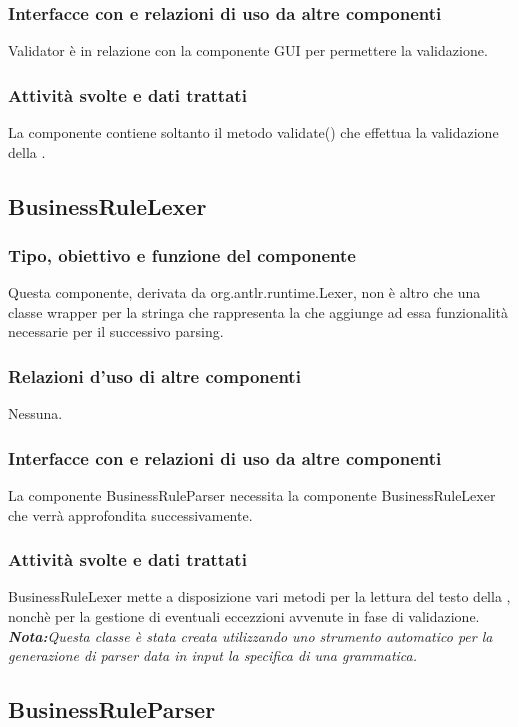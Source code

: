\documentclass[11pt,titlepage,a4paper]{report}
\begin{document}
\subsubsection{Interfacce con e relazioni di uso da altre componenti}
Validator \`e in relazione con la componente GUI per permettere la validazione.
\subsubsection{Attivit\`a svolte e dati trattati}
La componente contiene soltanto il metodo validate() che effettua la validazione della \br.

\subsection{BusinessRuleLexer}
\subsubsection{Tipo, obiettivo e funzione del componente}
Questa componente, derivata da org.antlr.runtime.Lexer, non \`e altro che una classe wrapper per la stringa che rappresenta la \br che aggiunge ad essa funzionalit\`a necessarie per il successivo parsing.
\subsubsection{Relazioni d'uso di altre componenti}
Nessuna.
\subsubsection{Interfacce con e relazioni di uso da altre componenti}
La componente BusinessRuleParser necessita la componente BusinessRuleLexer che verr\`a approfondita successivamente.
\subsubsection{Attivit\`a svolte e dati trattati}
BusinessRuleLexer mette a disposizione vari metodi per la lettura del testo della \br, nonch\`e per la gestione di eventuali eccezzioni avvenute in fase di validazione.\\
\textit{\textbf{Nota:}Questa classe \`e stata creata utilizzando uno strumento automatico per la generazione di parser data in input la specifica di una grammatica.}

\subsection{BusinessRuleParser}
\end{document}
